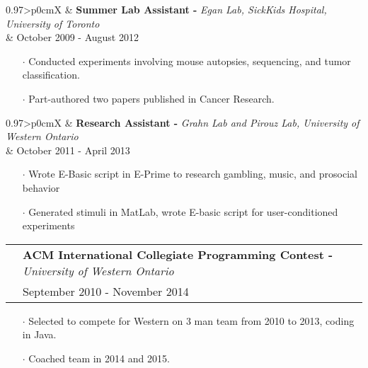 \documentclass[letterpaper, oneside, final]{scrartcl} %
\newcommand{\gray}{\rowcolor[gray]{.90}} %
\begin{document}
\begin{center}
\begin{tabularx}{0.97\linewidth}{>{\raggedleft\scshape}p{0cm}X}
\gray & \textbf{Summer Lab Assistant -} \textit{Egan Lab, SickKids Hospital, University of Toronto}\\
\gray & {October 2009 - August 2012}\\
\end{tabularx}
\vspace{-0.1cm}
\begin{itemize} \itemsep-0.2cm
\item[$\cdot$] Conducted experiments involving mouse autopsies, sequencing, and tumor classification.
\item[$\cdot$] Part-authored two papers published in Cancer Research.\\
\end{itemize}

\begin{tabularx}{0.97\linewidth}{>{\raggedleft\scshape}p{0cm}X}
\gray & \textbf{Research Assistant -} \textit{Grahn Lab and Pirouz Lab, University of Western Ontario}\\
\gray & {October 2011 - April 2013}\\
\end{tabularx}
\vspace{-0.1cm}
\begin{itemize} \itemsep-0.2cm
\item[$\cdot$] Wrote E-Basic script in E-Prime to research gambling, music, and prosocial behavior\\
\item[$\cdot$] Generated stimuli in MatLab, wrote E-basic script for user-conditioned experiments\\
\end{itemize}

\begin{tabularx}{0.97\linewidth}{>{\raggedleft\scshape}p{0cm}X}
\gray & \textbf{ACM International Collegiate Programming Contest -} \textit{University of Western Ontario}\\
\gray & {September 2010 - November 2014}\	\
\end{tabularx}
\vspace{-0.1cm}
\begin{itemize} \itemsep-0.2cm
\item[$\cdot$] Selected to compete for Western on 3 man team from 2010 to 2013, coding in Java.
\item[$\cdot$] Coached team in 2014 and 2015.\\

\end{itemize}


\end{center}
\end{document}
